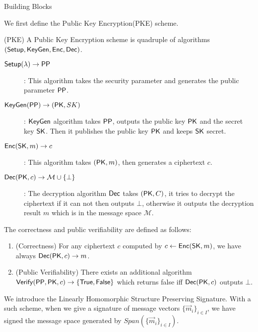 \begin{subsection}{Building Blocks}

  We first define the Public Key Encryption(PKE) scheme.

  \begin{myDef}{(PKE)} A Public Key Encryption scheme is quadruple of algorithms $({\mathsf{Setup}}, {\mathsf{KeyGen}}, {\mathsf{Enc}}, {\mathsf{Dec}})$.
    \begin{description}
    \item[$\boldmath{{\mathsf{Setup}}(\lambda) \to \mathsf{PP}}$]: This algorithm takes the security parameter and generates the public parameter $\mathsf{PP}$.
    \item[$\boldmath{{\mathsf{KeyGen}}(\mathsf{PP}) \to (\mathsf{PK}, SK)}$]: ${\mathsf{KeyGen}}$ algorithm takes $\mathsf{PP}$, outputs the public key $\mathsf{PK}$ and the secret key $\mathsf{SK}$. Then it publishes the public key $\mathsf{PK}$ and keeps $\mathsf{SK}$ secret.
    \item[$\boldmath{{\mathsf{Enc}}(\mathsf{SK}, m) \to c}$]: This algorithm takes $(\mathsf{PK}, m)$, then generates a ciphertext $c$.
    \item[$\boldmath{{\mathsf{Dec}}(\mathsf{PK}, c) \to \mathcal{M} \cup \{\bot\}}$]: The decryption algorithm ${\mathsf{Dec}}$ takes $(\mathsf{PK}, C)$, it tries to decrypt the ciphertext if it can not then outputs $\bot$, otherwise it outputs the decryption result $m$ which is in the message space $\mathcal{M}$.
    \end{description}

    The correctness and public verifiability are defined as follows:
    \begin{enumerate}
    \item (Correctness) For any ciphertext $c$ computed by $c \gets {\mathsf{Enc}}(\mathsf{SK}, m)$, we have always ${\mathsf{Dec}}(\mathsf{PK}, c) \to m$.
    \item (Public Verifiability) There exists an additional algorithm ${\mathsf{Verify}}(\mathsf{PP}, \mathsf{PK}, c) \to \{\mathsf{True}, \mathsf{False}\}$ which returns false iff ${\mathsf{Dec}}(\mathsf{PK}, c)$ outputs $\bot$. 
    \end{enumerate}
  \end{myDef}
  

  
  We introduce the Linearly Homomorphic Structure Preserving Signature. With a such scheme, when we give a signature of message vectors $\{\vec{m}_i\}_{i \in I}$, we have signed the message space generated by $Span(\{\vec{m}_i\}_{i \in I})$.
  

\end{subsection}
